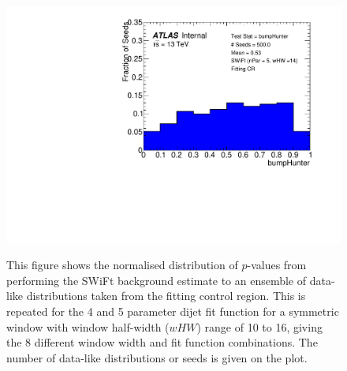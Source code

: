 \begin{figure}[!tb]
{}                                                                                              
 {                                                    
  \includegraphics[width=0.45\linewidth, angle=0]{figs/Dibjet/LowMass/FitStudy_min566/pVal_bumpHunter_corrFitCR_5para_low14_high14.pdf}
}                                                                                              

\caption{\label{fig:bumpH_spuriousSignal}
  This figure shows the normalised distribution of \bh{} \mbox{$p$-value}s from performing the SWiFt background estimate to an ensemble of
  data-like distributions taken from the \lm{} fitting control region.
  This is repeated for the 4 and 5 parameter dijet fit function for a symmetric window with window half-width ($wHW$) range of 10 to 16,
  giving the 8 different window width and fit function combinations.
  The number of data-like distributions or seeds is given on the plot.
}
\end{figure}
